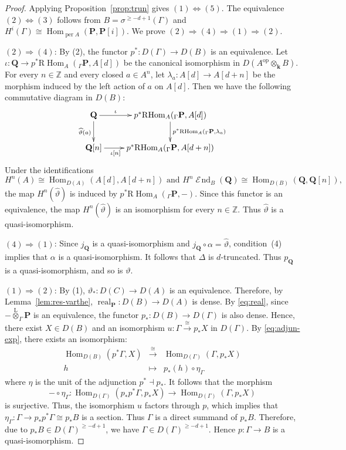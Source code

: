 \documentclass[11pt,a4paper,reqno]{amsart}
\theoremstyle{plain}
\numberwithin{equation}{section}
\theoremstyle{definition}
\providecommand{\per}{\operatorname{per}}
\newcommand{\Hom}{\operatorname{Hom}}
\newcommand{\RHom}{\mathrm R\!\Hom}
\newcommand{\real}{\operatorname{real}}
\renewcommand{\k}{\mathbf{k}}
\DeclareMathOperator{\huaEnd}{\mathcal{E}\!nd}
\newcommand{\PP}{\mathbf{P}}
\newcommand{\QQ}{\mathbf{Q}}
\begin{document}
\begin{proof}
Applying Proposition~\ref{prop:trun} gives $(1)\Leftrightarrow(5)$. The equivalence $(2)\Leftrightarrow(3)$ follows from
$B=\sigma^{\geq-d+1}(\Gamma)$ and
$H^i(\Gamma)\cong\Hom_{\per A}(\PP,\PP[i])$.
We prove $(2)\Rightarrow(4)\Rightarrow(1)\Rightarrow(2)$.

$(2)\Rightarrow(4)$: By (2),
the functor
$p^*\colon D(\Gamma)\to D(B)$ is an equivalence. Let $\iota\colon\QQ\to p^*\RHom_A({}_{\Gamma}\PP,A[d])$ be the canonical isomorphism in $D(A^{\mathrm{op}}\otimes_\k B)$. For every $n\in\mathbb Z$ and every closed $a\in A^n$, let $\lambda_a\colon A[d]\to A[d+n]$ be the morphism induced by the left action of $a$ on $A[d]$. Then we have the following commutative diagram in $D(B)$:
\[
\xymatrix{
  \QQ\ar[r]^{\iota\qquad\qquad}\ar[d]_{\widehat\vartheta(a)}&p^*\RHom_A({}_{\Gamma}\PP,A[d])\ar[d]^{p^*\RHom_A({}_{\Gamma}\PP,\lambda_a)}\\
  \QQ[n]\ar[r]_{\iota[n]\qquad\qquad}&p^*\RHom_A({}_{\Gamma}\PP,A[d+n])
}
\]
Under the identifications 
\[H^n(A)\cong\Hom_{D(A)}(A[d],A[d+n])\text{ and }H^n\huaEnd_B(\QQ)\cong\Hom_{D(B)}(\QQ,\QQ[n]),\]
the map $H^n(\widehat\vartheta)$ is induced by $p^*\RHom_A({}_\Gamma\PP,-)$. Since this functor is an equivalence, the map $H^n(\widehat\vartheta)$ is an isomorphism for every $n\in\mathbb Z$. Thus $\widehat\vartheta$ is a quasi-isomorphism.

$(4)\Rightarrow(1)$: Since $j_{\QQ}$ is a quasi-isomorphism and
$j_{\QQ}\circ\alpha=\widehat\vartheta$, condition~(4)
implies that $\alpha$ is a quasi-isomorphism.
It follows that $\Delta$ is $d$-truncated. Thus $p_{\QQ}$ is a quasi-isomorphism, and so is
$\vartheta$.

$(1)\Rightarrow(2)$: By (1), $\vartheta_*\colon D(C)\to D(A)$ is an equivalence. Therefore, by Lemma~\ref{lem:res-varthe}, $\real_{\PP}\colon D(B)\to D(A)$ is dense. By \eqref{eq:real}, since $-\overset{\mathrm L}{\otimes}_\Gamma\PP$ is an equivalence, the functor $p_*\colon D(B)\to D(\Gamma)$ is also dense. Hence, there exist $X\in D(B)$ and an isomorphism $u\colon\Gamma\xrightarrow{\cong}p_*X$ in $D(\Gamma)$. By \eqref{eq:adjun-exp}, there exists an isomorphism:
\[
\begin{array}{ccc}
  \Hom_{D(B)}(p^*\Gamma,X) & \xrightarrow{\cong} & \Hom_{D(\Gamma)}(\Gamma,p_*X)\\
  h & \mapsto & p_*(h)\circ \eta_\Gamma
\end{array}
\]
where $\eta$ is the unit of the adjunction $p^*\dashv p_*$. It follows that the morphism 
\[-\circ \eta_\Gamma\colon \Hom_{D(\Gamma)}(p_*p^*\Gamma,p_*X)\to\Hom_{D(\Gamma)}(\Gamma,p_*X)\]
is surjective. Thus, the isomorphism $u$ factors through $p$, which implies that $\eta_\Gamma\colon\Gamma\to p_*p^*\Gamma\cong p_*B$ is a section. Thus $\Gamma$ is a direct summand of $p_*B$.
Therefore, due to $p_*B\in D(\Gamma)^{\geq-d+1}$,
we have $\Gamma\in D(\Gamma)^{\geq-d+1}$. Hence $p\colon\Gamma\to B$ is a quasi-isomorphism.
\end{proof}
\end{document}
